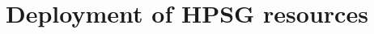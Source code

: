 \documentclass[output=paper]{langsci/langscibook}
\begin{document}










\section{Deployment of HPSG resources}
\label{sec:deployment}

\end{document}
